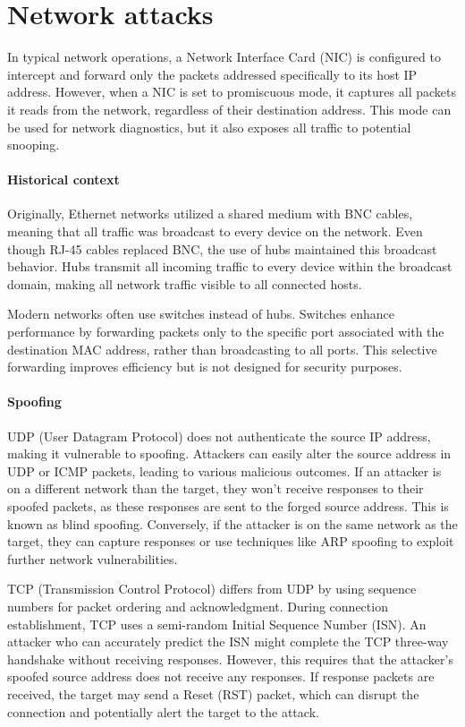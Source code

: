 \section{Network attacks}

In typical network operations, a Network Interface Card (NIC) is configured to intercept and forward only the packets addressed specifically to its host IP address. 
However, when a NIC is set to promiscuous mode, it captures all packets it reads from the network, regardless of their destination address.
This mode can be used for network diagnostics, but it also exposes all traffic to potential snooping.

\paragraph*{Historical context}
Originally, Ethernet networks utilized a shared medium with BNC cables, meaning that all traffic was broadcast to every device on the network.
Even though RJ-45 cables replaced BNC, the use of hubs maintained this broadcast behavior. 
Hubs transmit all incoming traffic to every device within the broadcast domain, making all network traffic visible to all connected hosts.

Modern networks often use switches instead of hubs. 
Switches enhance performance by forwarding packets only to the specific port associated with the destination MAC address, rather than broadcasting to all ports. 
This selective forwarding improves efficiency but is not designed for security purposes.

\paragraph*{Spoofing}
UDP (User Datagram Protocol) does not authenticate the source IP address, making it vulnerable to spoofing.
Attackers can easily alter the source address in UDP or ICMP packets, leading to various malicious outcomes.
If an attacker is on a different network than the target, they won't receive responses to their spoofed packets, as these responses are sent to the forged source address. 
This is known as blind spoofing.
Conversely, if the attacker is on the same network as the target, they can capture responses or use techniques like ARP spoofing to exploit further network vulnerabilities.

TCP (Transmission Control Protocol) differs from UDP by using sequence numbers for packet ordering and acknowledgment. 
During connection establishment, TCP uses a semi-random Initial Sequence Number (ISN).
An attacker who can accurately predict the ISN might complete the TCP three-way handshake without receiving responses. 
However, this requires that the attacker's spoofed source address does not receive any responses. 
If response packets are received, the target may send a Reset (RST) packet, which can disrupt the connection and potentially alert the target to the attack.

